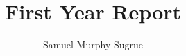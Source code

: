 \documentclass[12pt]{article}
\begin{document}


\title{First Year Report}
\author{Samuel Murphy-Sugrue\\}

\maketitle
\clearpage
\tableofcontents
\clearpage


\end{document}
